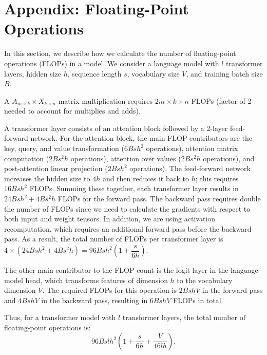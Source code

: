 \documentclass[sigconf,nonacm]{acmart}
\begin{document}
\section*{Appendix: Floating-Point Operations}
\label{sec:appendix}

In this section, we describe how we calculate the number of floating-point operations (FLOPs) in a model. We consider a language model with $l$ transformer layers, hidden size $h$, sequence length $s$, vocabulary size $V$, and training batch size $B$.

A $A_{m \times k} \times X_{k \times n}$ matrix multiplication requires $2m \times k \times n$ FLOPs (factor of 2 needed to account for multiplies and adds). 

A transformer layer consists of an attention block followed by a 2-layer feed-forward network. For the attention block, the main FLOP contributors are the key, query, and value transformation ($6Bsh^2$ operations), attention matrix computation ($2Bs^2h$ operations), attention over values ($2Bs^2h$ operations), and post-attention linear projection ($2Bsh^2$ operations). The feed-forward network increases the hidden size to $4h$ and then reduces it back to $h$; this requires $16Bsh^2$ FLOPs. Summing these together, each transformer layer results in $24Bsh^2 + 4Bs^2h$ FLOPs for the forward pass. The backward pass requires double the number of FLOPs since we need to calculate the gradients with respect to both input and weight tensors. In addition, we are using activation recomputation, which requires an additional forward pass before the backward pass. As a result, the total number of FLOPs per transformer layer is
$4 \times \left(24Bsh^2 + 4Bs^2h\right) = 96Bsh^2\left(1 + \dfrac{s}{6h}\right)$.

The other main contributor to the FLOP count is the logit layer in the language model head, which transforms features of dimension $h$ to the vocabulary dimension $V$. The required FLOPs for this operation is $2BshV$ in the forward pass and $4BshV$ in the backward pass, resulting in $6BshV$ FLOPs in total.

Thus, for a transformer model with $l$ transformer layers, the total number of floating-point operations is:
$$96Bslh^2\left(1 + \dfrac{s}{6h} + \dfrac{V}{16lh}\right).$$

\newpage



\end{document}
